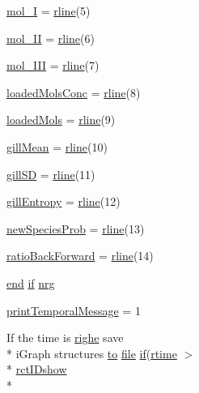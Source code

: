 \begin{DoxyCompactItemize}
\hyperlink{a00022_aa34a234182765424bb00fc9fa273a9af}{mol\-\_\-\-I} = \hyperlink{a00022_ab5b947e1a8b7cf496ffd4eb21317052e}{rline}(5)
\item 
\hyperlink{a00022_a4f157720ec2d86dca3cf99f650dc5777}{mol\-\_\-\-I\-I} = \hyperlink{a00022_ab5b947e1a8b7cf496ffd4eb21317052e}{rline}(6)
\item 
\hyperlink{a00022_adf61c91ad9a34233b3fe493e21f8969e}{mol\-\_\-\-I\-I\-I} = \hyperlink{a00022_ab5b947e1a8b7cf496ffd4eb21317052e}{rline}(7)
\item 
\hyperlink{a00022_a96e1a3cfb8478cba3fec1e7a5839bb44}{loaded\-Mols\-Conc} = \hyperlink{a00022_ab5b947e1a8b7cf496ffd4eb21317052e}{rline}(8)
\item 
\hyperlink{a00022_a9ec42402ca3b08b7f3f2b602e1e2f3b0}{loaded\-Mols} = \hyperlink{a00022_ab5b947e1a8b7cf496ffd4eb21317052e}{rline}(9)
\item 
\hyperlink{a00022_a7d36858faf2f8bb5963306c86db2b549}{gill\-Mean} = \hyperlink{a00022_ab5b947e1a8b7cf496ffd4eb21317052e}{rline}(10)
\item 
\hyperlink{a00022_a187931f510c22818692d094c8026ebd1}{gill\-S\-D} = \hyperlink{a00022_ab5b947e1a8b7cf496ffd4eb21317052e}{rline}(11)
\item 
\hyperlink{a00022_aef2e92fdea881fe7819bf51b2d7e0783}{gill\-Entropy} = \hyperlink{a00022_ab5b947e1a8b7cf496ffd4eb21317052e}{rline}(12)
\item 
\hyperlink{a00022_aa66147edba72bc0b9cf591cd7475396f}{new\-Species\-Prob} = \hyperlink{a00022_ab5b947e1a8b7cf496ffd4eb21317052e}{rline}(13)
\item 
\hyperlink{a00022_a32ac1074f1b1cce044e95ec345f378e7}{ratio\-Back\-Forward} = \hyperlink{a00022_ab5b947e1a8b7cf496ffd4eb21317052e}{rline}(14)
\item 
\hyperlink{a00019_afb358f48b1646c750fb9da6c6585be2b}{end} \hyperlink{a00024_a01d55766b8058903dd360b4bda71f9f5}{if} \hyperlink{a00022_af837f695e5b67c86016c1a82608c38b4}{nrg}
\item 
\hyperlink{a00022_acc16e80f122cc11cf1570c53597afb19}{print\-Temporal\-Message} = 1
\item 
If the time is \hyperlink{a00060_abdf49e297e2c121f2d09f075ac3d518a}{righe} save \\*
i\-Graph structures \hyperlink{a00022_af71dbe52628a3f83a77ab494817525c6}{to} \hyperlink{a00062_a4e8353d6c62cf54bf4a1a8f63e56b8c3}{file} \hyperlink{a00024_a01d55766b8058903dd360b4bda71f9f5}{if}(\hyperlink{a00022_afc6b38657a313b9f1de2ee356910b6ee}{rtime} $>$\\*
 \hyperlink{a00022_acfa9ac92c0e448faa531767d0e6ab194}{rct\-I\-Dshow} \\*

\end{DoxyCompactItemize}

